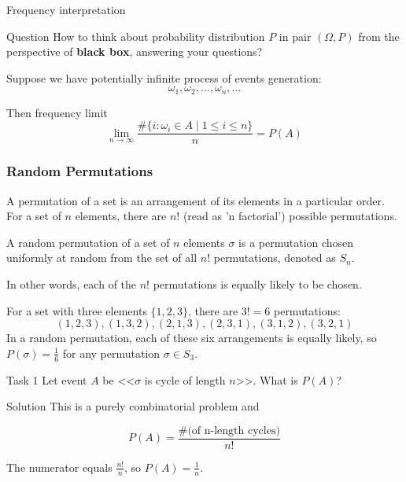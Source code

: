\documentclass[fullscreen=true, bookmarks=true, hyperref={pdfencoding=unicode}]{beamer}
\begin{document}
\begin{frame}{Frequency interpretation}
  \pause
  \begin{block}{Question}
    How to think about probability distribution $P$ in pair $(\Omega, P)$ 
    from the perspective of \textbf{black box}, answering your questions?      
  \end{block}

  \pause
  Suppose we have potentially infinite process of events generation:
  $$\omega_1, \omega_2, \dots, \omega_n, \dots $$

  \pause
  Then frequency limit
  $$ \lim\limits_{n \to \infty} \frac{\# \{i : \omega_i \in A \mid 1 \leq i \leq n\}}{n} = P(A)$$

\end{frame}


\begin{frame}
  \frametitle{Random Permutations}

  A permutation of a set is an arrangement of its elements in a particular order. For a set of $n$ elements, there are $n!$ (read as 'n factorial') possible permutations. 

  \pause
  \begin{definition}
    A random permutation of a set of $n$ elements $\sigma$ is a permutation 
    chosen uniformly at random from the set of all $n!$ permutations, denoted as $S_n$.
  \end{definition}

  In other words, each of the $n!$ permutations is equally likely to be chosen.

  \pause
  \begin{example}
    For a set with three elements $\{1, 2, 3\}$, there are $3! = 6$ permutations: 
    \[
    (1,2,3), (1,3,2), (2,1,3), (2,3,1), (3,1,2), (3,2,1)
    \]
    In a random permutation, each of these six arrangements is equally likely, 
    so $P(\sigma) = \frac{1}{6}$ for any permutation $\sigma \in S_3$.
  \end{example}
\end{frame}


\begin{frame}{Task 1}
  Let event $A$ be <<$\sigma$ is cycle of length $n$>>. What is $P(A)$?

  \pause
  \begin{block}{Solution}
    This is a purely combinatorial problem and 

    $$P(A) = \frac{\# \text{(of n-length cycles)}}{n!}$$
    
    \pause
    The numerator equals $\frac{n!}{n}$, so $P(A) = \frac{1}{n}$.
  \end{block}

\end{frame}
\end{document}
